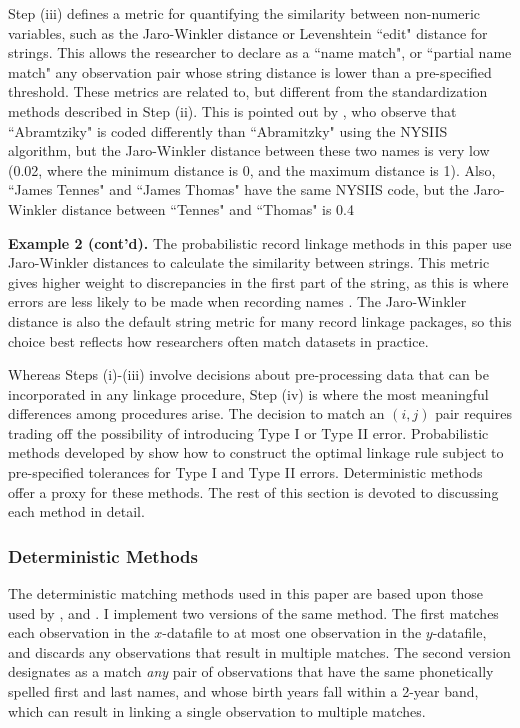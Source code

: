 \documentclass[12pt]{article}
\begin{document}
Step (iii) defines a metric for quantifying the similarity between non-numeric variables, such as the Jaro-Winkler distance or Levenshtein ``edit" distance for strings.  This allows the researcher to declare as a ``name match", or ``partial name match" any observation pair whose string distance is lower than a pre-specified threshold.  These metrics are related to, but different from the standardization methods described in Step (ii).  This is pointed out by \citet*{arp2018}, who observe that ``Abramtziky" is coded differently than ``Abramitzky" using the NYSIIS algorithm, but the Jaro-Winkler distance between these two names is very low (0.02, where the minimum distance is 0, and the maximum distance is 1).  Also, ``James Tennes" and ``James Thomas" have the same NYSIIS code, but the Jaro-Winkler distance between ``Tennes" and ``Thomas" is 0.4 

\addlinespace
\textbf{Example 2 (cont'd).}  The probabilistic record linkage methods in this paper use Jaro-Winkler distances to calculate the similarity between strings.  This metric gives higher weight to discrepancies in the first part of the string, as this is where errors are less likely to be made when recording names \citep*{jaro, winkler06}.  The Jaro-Winkler distance is also the default string metric for many record linkage packages, so this choice best reflects how researchers often match datasets in practice. 
\addlinespace

Whereas Steps (i)-(iii) involve decisions about pre-processing data that can be incorporated in any linkage procedure, Step (iv) is where the most meaningful differences among procedures arise.  The decision to match an $(i,j)$ pair requires trading off the possibility of introducing Type I or Type II error.  Probabilistic methods developed by \cite{fellegi69} show how to construct the optimal linkage rule subject to pre-specified tolerances for Type I and Type II errors.  Deterministic methods offer a proxy for these methods.   The rest of this section is devoted to discussing each method in detail.

\subsubsection{Deterministic Methods}
The deterministic matching methods used in this paper are based upon those used by \citet*{abe2012, abe2014, abe2019b}, and \cite{ferrie96}.  I implement two versions of the same method.  The first matches each observation in the $x$-datafile to at most one observation in the $y$-datafile, and discards any observations that result in multiple matches.  The second version designates as a match \textit{any} pair of observations that have the same phonetically spelled first and last names, and whose birth years fall within a 2-year band, which can result in linking a single observation to multiple matches. 
\end{document}
